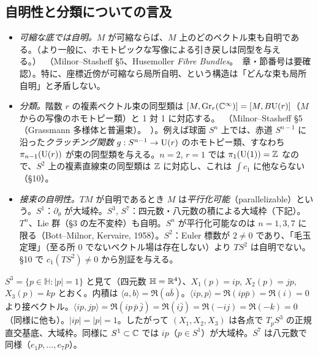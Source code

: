 \subsection{自明性と分類についての言及}
\begin{itemize}
\item \emph{可縮な底では自明。}$M$ が可縮ならば、$M$ 上のどのベクトル束も自明である。（より一般に、ホモトピックな写像による引き戻しは同型を与える。）\tC\ （Milnor--Stasheff §5、Husemoller \emph{Fibre Bundles}。\tQ\ 章・節番号は要確認）。特に、座標近傍が可縮なら局所自明、という構造は「どんな束も局所自明」と矛盾しない。
\item \emph{分類。}階数 $r$ の複素ベクトル束の同型類は $[M,\mathrm{Gr}_r(\mathbb C^\infty)]=[M,B\mathrm{U}(r)]$（$M$ からの写像のホモトピー類）と 1 対 1 に対応する。\tC\ （Milnor--Stasheff §5（Grassmann 多様体と普遍束）。\tQ\ ）。例えば球面 $S^n$ 上では、赤道 $S^{n-1}$ に沿った\emph{クラッチング関数} $g:S^{n-1}\to\mathrm{U}(r)$ のホモトピー類、すなわち $\pi_{n-1}(\mathrm{U}(r))$ が束の同型類を与える。$n=2$, $r=1$ では $\pi_1(\mathrm{U}(1))=\mathbb Z$ なので、$S^2$ 上の複素直線束の同型類は $\mathbb Z$ に対応し、これは $\int c_1$ に他ならない（§10）。
\item \emph{接束の自明性。}$TM$ が自明であるとき $M$ は\emph{平行化可能}（parallelizable）という。$S^1$：$\partial_\theta$ が大域枠。$S^3$, $S^7$：四元数・八元数の積による大域枠（下記）。$T^n$、Lie 群（§3 の左不変枠）も自明。$S^n$ が平行化可能なのは $n=1,3,7$ に限る（Bott--Milnor, Kervaire, 1958）\tC。$S^2$：Euler 標数が $2\ne0$ であり、「毛玉定理」（至る所 $0$ でないベクトル場は存在しない）より $TS^2$ は自明でない。§10 で $c_1(TS^2)\ne0$ から別証を与える。
\end{itemize}

\begin{ex}[$TS^3$ は自明]\label{C:ex:TS3}
$S^3=\{p\in\mathbb H:|p|=1\}$ と見て（四元数 $\mathbb H=\mathbb R^4$）、$X_1(p)=ip$, $X_2(p)=jp$, $X_3(p)=kp$ とおく。内積は $\langle a,b\rangle=\Re(a\bar b)$。$\langle ip,p\rangle=\Re(ip\bar p)=\Re(i)=0$ より接ベクトル。$\langle ip,jp\rangle=\Re(ip\,\bar p\,\bar j)=\Re(i\bar j)=\Re(-ij)=\Re(-k)=0$（同様に他も）。$|ip|=|p|=1$。したがって $(X_1,X_2,X_3)$ は各点で $T_pS^3$ の正規直交基底、大域枠。同様に $S^1\subset\mathbb C$ では $ip$（$p\in S^1$）が大域枠。$S^7$ は八元数で同様（$e_1p,\dots,e_7p$）。\tC
\end{ex}

